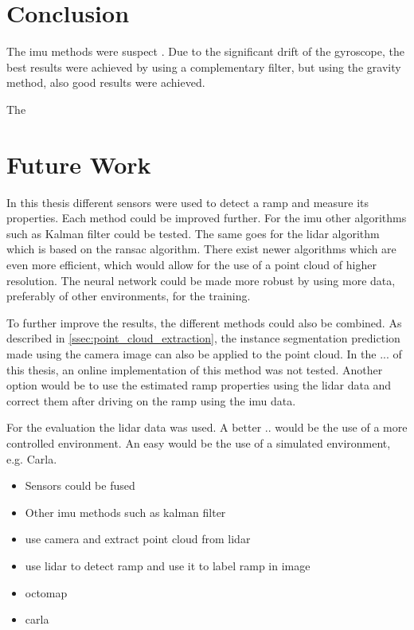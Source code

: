 \section{Conclusion}
The \gls{imu} methods were suspect .
Due to the significant drift of the gyroscope, the best results were achieved by using a complementary filter, but using the gravity method, also good results were achieved.

The



\section{Future Work}
In this thesis different sensors were used to detect a ramp and measure its properties.
Each method could be improved further.
For the \gls{imu} other algorithms such as Kalman filter could be tested.
The same goes for the \gls{lidar} algorithm which is based on the \gls{ransac} algorithm.
There exist newer algorithms which are even more efficient, which would allow for the use of a point cloud of higher resolution.
The neural network could be made more robust by using more data, preferably of other environments, for the training.

To further improve the results, the different methods could also be combined.
As described in \cref{ssec:point_cloud_extraction}, the instance segmentation prediction made using the camera image can also be applied to the point cloud.
In the ... of this thesis, an online implementation of this method was not tested.
Another option would be to use the estimated ramp properties using the \gls{lidar} data and correct them after driving on the ramp using the \gls{imu} data.

For the evaluation the \gls{lidar} data was used.
A better .. would be the use of a more controlled environment.
An easy would be the use of a simulated environment, e.g. Carla.

\begin{itemize}
    \item Sensors could be fused
    \item Other \gls{imu} methods such as kalman filter
    \item use camera and extract point cloud from \gls{lidar}
    \item use \gls{lidar} to detect ramp and use it to label ramp in image
    \item octomap
    \item carla
\end{itemize}



